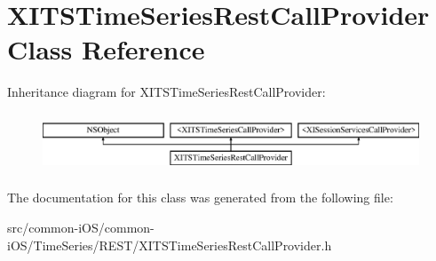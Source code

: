 \hypertarget{interface_x_i_t_s_time_series_rest_call_provider}{}\section{X\+I\+T\+S\+Time\+Series\+Rest\+Call\+Provider Class Reference}
\label{interface_x_i_t_s_time_series_rest_call_provider}
Inheritance diagram for X\+I\+T\+S\+Time\+Series\+Rest\+Call\+Provider\+:\begin{figure}[H]
\begin{center}
\leavevmode
\includegraphics[height=1.769352cm]{interface_x_i_t_s_time_series_rest_call_provider}
\end{center}
\end{figure}


The documentation for this class was generated from the following file\+:\begin{DoxyCompactItemize}
\item 
src/common-\/i\+O\+S/common-\/i\+O\+S/\+Time\+Series/\+R\+E\+S\+T/X\+I\+T\+S\+Time\+Series\+Rest\+Call\+Provider.\+h\end{DoxyCompactItemize}
